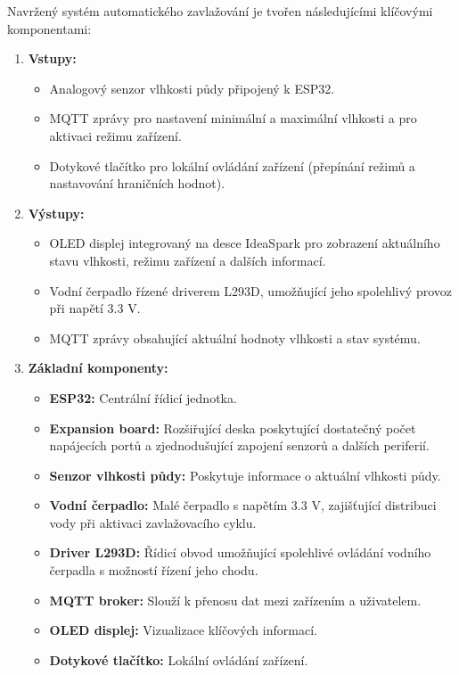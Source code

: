 \documentclass[a4paper, 11pt]{article}
\begin{document}
Navržený systém automatického zavlažování je tvořen následujícími klíčovými komponentami:
\begin{enumerate}
    \item \textbf{Vstupy:}
    \begin{itemize}
        \item Analogový senzor vlhkosti půdy připojený k ESP32.
        \item MQTT zprávy pro nastavení minimální a maximální vlhkosti a pro aktivaci režimu zařízení.
        \item Dotykové tlačítko pro lokální ovládání zařízení (přepínání režimů a nastavování hraničních hodnot).
    \end{itemize}
    \item \textbf{Výstupy:}
    \begin{itemize}
        \item OLED displej integrovaný na desce IdeaSpark pro zobrazení aktuálního stavu vlhkosti, režimu zařízení a dalších informací.
        \item Vodní čerpadlo řízené driverem L293D, umožňující jeho spolehlivý provoz při napětí 3.3 V.
        \item MQTT zprávy obsahující aktuální hodnoty vlhkosti a stav systému.
    \end{itemize}
    \item \textbf{Základní komponenty:}
    \begin{itemize}
        \item \textbf{ESP32:} Centrální řídicí jednotka.
        \item \textbf{Expansion board:} Rozšiřující deska poskytující dostatečný počet napájecích portů a zjednodušující zapojení senzorů a dalších periferií.
        \item \textbf{Senzor vlhkosti půdy:} Poskytuje informace o aktuální vlhkosti půdy.
        \item \textbf{Vodní čerpadlo:} Malé čerpadlo s napětím 3.3 V, zajišťující distribuci vody při aktivaci zavlažovacího cyklu.
        \item \textbf{Driver L293D:} Řídicí obvod umožňující spolehlivé ovládání vodního čerpadla s možností řízení jeho chodu.
        \item \textbf{MQTT broker:} Slouží k přenosu dat mezi zařízením a uživatelem.
        \item \textbf{OLED displej:} Vizualizace klíčových informací.
        \item \textbf{Dotykové tlačítko:} Lokální ovládání zařízení.
    \end{itemize}
\end{enumerate}
\end{document}
